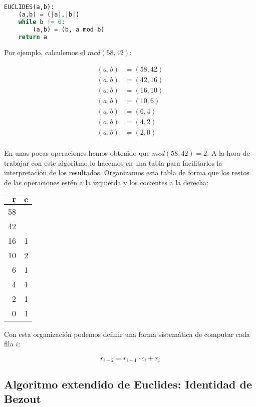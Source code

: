 \begin{lstlisting}[language=Python]
EUCLIDES(a,b):
	(a,b) = (|a|,|b|)
	while b != 0:
		(a,b) = (b, a mod b)
	return a
\end{lstlisting}

Por ejemplo, calculemos el $mcd(58,42)$:

\begin{align*}
	(a,b) & = (58, 42) \\
	(a,b) & = (42, 16) \\
	(a,b) & = (16, 10) \\
	(a,b) & = (10, 6) \\
	(a,b) & = (6, 4) \\
	(a,b) & = (4, 2) \\
	(a,b) & = (2, 0) \\
\end{align*}

En unas pocas operaciones hemos obtenido que $mcd(58,42) = 2$.
A la hora de trabajar con este algoritmo lo hacemos en una tabla para facilitarlos la interpretación de los resultados.
Organizamos esta tabla de forma que los restos de las operaciones estén a la izquierda y los cocientes a la derecha:

\begin{center}
\begin{tabular}{r r}
	$\boldsymbol{r}$ & $\boldsymbol{c}$ \\
	\toprule
	58               &                  \\
	42               &                  \\
	16               & 1                \\
	10               & 2                \\
	6                & 1                \\
	4                & 1                \\
	2                & 1                \\
	0                & 1                \\
\end{tabular}
\end{center}

Con esta organización podemos definir una forma sistemática de computar cada fila $i$:

\[r_{i-2} = r_{i-1} \cdot c_i + r_i\]

\subsection{Algoritmo extendido de Euclides: Identidad de Bezout}\label{algoritmo-extendido-de-euclides}

